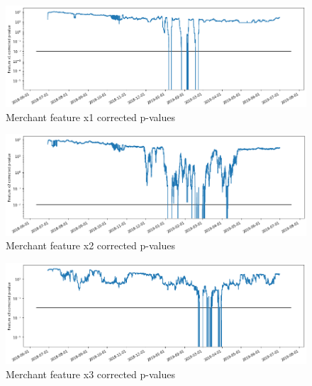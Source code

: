 \begin{figure}[!htb]
    \begin{center}
      \includegraphics[scale=0.5]{figures/merchant-x1-correctedpvalues.png}
      \caption{Merchant feature x1 corrected p-values}
      \label{fig:merchant-x1-correctedpvalues}
    \end{center}
\end{figure}

\begin{figure}[!htb]
    \begin{center}
      \includegraphics[scale=0.5]{figures/merchant-x2-correctedpvalues.png}
      \caption{Merchant feature x2 corrected p-values}
      \label{fig:merchant-x2-correctedpvalues}
    \end{center}
\end{figure}


\begin{figure}[!htb]
    \begin{center}
      \includegraphics[scale=0.5]{figures/merchant-x3-correctedpvalues.png}
      \caption{Merchant feature x3 corrected p-values}
      \label{fig:merchant-x3-correctedpvalues}
    \end{center}
\end{figure}


